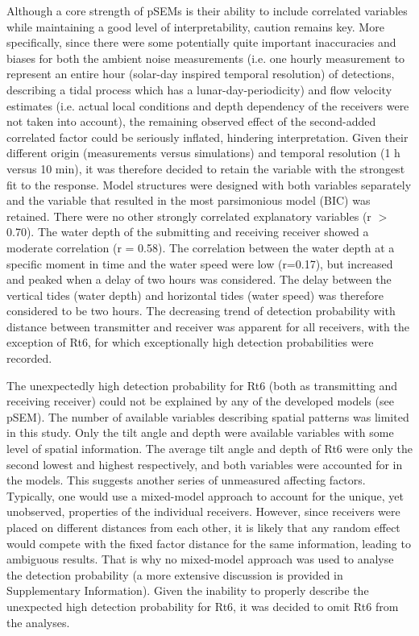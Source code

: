 \documentclass[doublespacing,linenumbers]{bmcart}
\begin{document}
Although a core strength of pSEMs is their ability to include correlated variables while maintaining a good level of interpretability, caution remains key. More specifically, since there were some potentially quite important inaccuracies and biases for both the ambient noise measurements (i.e. one hourly measurement to represent an entire hour (solar-day inspired temporal resolution) of detections, describing a tidal process which has a lunar-day-periodicity) and flow velocity estimates (i.e. actual local conditions and depth dependency of the receivers were not taken into account), the remaining observed effect of the second-added correlated factor could be seriously inflated, hindering interpretation. Given their different origin (measurements versus simulations) and temporal resolution (1 h versus 10 min), it was therefore decided to retain the variable with the strongest fit to the response. Model structures were designed with both variables separately and the variable that resulted in the most parsimonious model (BIC) was retained. There were no other strongly correlated explanatory variables (r $>$ 0.70). The water depth of the submitting and receiving receiver showed a moderate correlation (r = 0.58). The correlation between the water depth at a specific moment in time and the water speed were low (r=0.17), but increased and peaked when a delay of two hours was considered. The delay between the vertical tides (water depth) and horizontal tides (water speed) was therefore considered to be two hours. The decreasing trend of detection probability with distance between transmitter and receiver was apparent for all receivers, with the exception of Rt6, for which exceptionally high detection probabilities were recorded.  

The unexpectedly high detection probability for Rt6 (both as transmitting and receiving receiver) could not be explained by any of the developed models (see pSEM). The number of available variables describing spatial patterns was limited in this study. Only the tilt angle and depth were available variables with some level of spatial information. The average tilt angle and depth of Rt6 were only the second lowest and highest respectively, and both variables were accounted for in the models. This suggests another series of unmeasured affecting factors. Typically, one would use a mixed-model approach to account for the unique, yet unobserved, properties of the individual receivers. However, since receivers were placed on different distances from each other, it is likely that any random effect would compete with the fixed factor distance for the same information, leading to ambiguous results. That is why no mixed-model approach was used to analyse the detection probability (a more extensive discussion is provided in Supplementary Information). Given the inability to properly describe the unexpected high detection probability for Rt6, it was decided to omit Rt6 from the analyses. 
\end{document}
